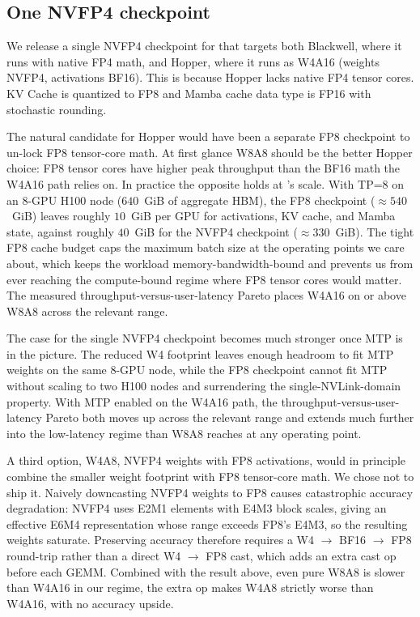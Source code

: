 \subsection{One NVFP4 checkpoint}

We release a single NVFP4 checkpoint for \ourmodel{} that targets both
Blackwell, where it runs with native FP4 math, and Hopper, where it runs
as W4A16 (weights NVFP4, activations BF16). This is because Hopper lacks native FP4
tensor cores. KV Cache is quantized to FP8 and Mamba cache data type is FP16 with stochastic rounding.

The natural candidate for Hopper would have been a separate FP8 checkpoint to un-lock FP8 tensor-core math.
At first glance W8A8 should be the better Hopper choice: FP8 tensor
cores have higher peak throughput than the BF16 math the W4A16 path
relies on. In practice the opposite holds at \ourmodel's scale. With
TP=8 on an 8-GPU H100 node ($640$~GiB of aggregate HBM), the FP8
checkpoint ($\approx 540$~GiB) leaves roughly $10$~GiB per GPU for
activations, KV cache, and Mamba state, against roughly $40$~GiB for
the NVFP4 checkpoint ($\approx 330$~GiB). The tight FP8 cache budget
caps the maximum batch size at the operating points we care about,
which keeps the workload memory-bandwidth-bound and prevents us from
ever reaching the compute-bound regime where FP8 tensor cores would
matter. The measured throughput-versus-user-latency Pareto places
W4A16 on or above W8A8 across the relevant range.

The case for the single NVFP4 checkpoint becomes much stronger once
MTP is in the picture. The reduced W4 footprint leaves enough headroom
to fit MTP weights on the same 8-GPU node, while the FP8 checkpoint
cannot fit MTP without scaling to two H100 nodes and surrendering the
single-NVLink-domain property. With MTP enabled on the W4A16 path, the
throughput-versus-user-latency Pareto both moves up across the relevant
range and extends much further into the low-latency regime than W8A8
reaches at any operating point.

A third option, W4A8, NVFP4 weights with FP8 activations, would
in principle combine the smaller weight footprint with FP8 tensor-core
math. We chose not to ship it. Naively downcasting NVFP4 weights to FP8
causes catastrophic accuracy degradation: NVFP4 uses E2M1 elements with
E4M3 block scales, giving an effective E6M4 representation whose range
exceeds FP8's E4M3, so the resulting weights saturate. Preserving
accuracy therefore requires a W4 $\rightarrow$ BF16 $\rightarrow$ FP8
round-trip rather than a direct W4 $\rightarrow$ FP8 cast, which adds
an extra cast op before each GEMM. Combined with the result above, 
even pure W8A8 is slower than W4A16 in our regime, the extra op
makes W4A8 strictly worse than W4A16, with no accuracy upside.

